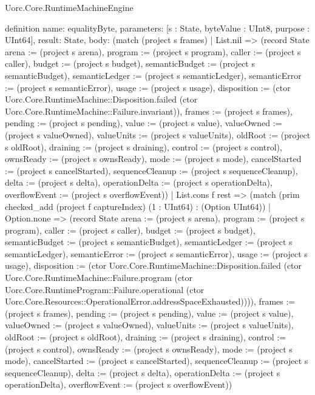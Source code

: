 \begin{lexlean}{Uorc.Core.RuntimeMachineEngine}
\begin{semanticmodule}
definition{
  name: equalityByte,
  parameters: [s : State, byteValue : UInt8, purpose : UInt64],
  result: State,
  body: (match (project s frames)
    | List.nil => (record State {arena := (project s arena), program := (project s program), caller := (project s caller), budget := (project s budget), semanticBudget := (project s semanticBudget), semanticLedger := (project s semanticLedger), semanticError := (project s semanticError), usage := (project s usage), disposition := (ctor Uorc.Core.RuntimeMachine::Disposition.failed (ctor Uorc.Core.RuntimeMachine::Failure.invariant)), frames := (project s frames), pending := (project s pending), value := (project s value), valueOwned := (project s valueOwned), valueUnits := (project s valueUnits), oldRoot := (project s oldRoot), draining := (project s draining), control := (project s control), ownsReady := (project s ownsReady), mode := (project s mode), cancelStarted := (project s cancelStarted), sequenceCleanup := (project s sequenceCleanup), delta := (project s delta), operationDelta := (project s operationDelta), overflowEvent := (project s overflowEvent)})
    | List.cons f rest => (match (prim checked_add (project f captureIndex) (1 : UInt64) : (Option UInt64))
      | Option.none => (record State {arena := (project s arena), program := (project s program), caller := (project s caller), budget := (project s budget), semanticBudget := (project s semanticBudget), semanticLedger := (project s semanticLedger), semanticError := (project s semanticError), usage := (project s usage), disposition := (ctor Uorc.Core.RuntimeMachine::Disposition.failed (ctor Uorc.Core.RuntimeMachine::Failure.program (ctor Uorc.Core.RuntimeProgram::Failure.operational (ctor Uorc.Core.Resources::OperationalError.addressSpaceExhausted)))), frames := (project s frames), pending := (project s pending), value := (project s value), valueOwned := (project s valueOwned), valueUnits := (project s valueUnits), oldRoot := (project s oldRoot), draining := (project s draining), control := (project s control), ownsReady := (project s ownsReady), mode := (project s mode), cancelStarted := (project s cancelStarted), sequenceCleanup := (project s sequenceCleanup), delta := (project s delta), operationDelta := (project s operationDelta), overflowEvent := (project s overflowEvent)})
}
\end{semanticmodule}
\end{lexlean}
